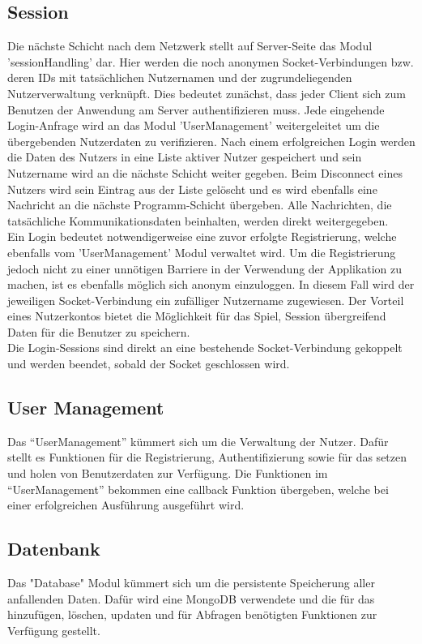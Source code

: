 \documentclass[a4paper]{spie}  %
\begin{document}
\subsection{Session}
Die nächste Schicht nach dem Netzwerk stellt auf Server-Seite das Modul 'sessionHandling' dar. Hier werden die noch anonymen Socket-Verbindungen bzw. deren IDs mit tatsächlichen Nutzernamen und der zugrundeliegenden Nutzerverwaltung verknüpft. Dies bedeutet zunächst, dass jeder Client sich zum Benutzen der Anwendung am Server authentifizieren muss. Jede eingehende Login-Anfrage wird an das Modul 'UserManagement' weitergeleitet um die übergebenden Nutzerdaten zu verifizieren. Nach einem erfolgreichen Login werden die Daten des Nutzers in eine Liste aktiver Nutzer gespeichert und sein Nutzername wird an die nächste Schicht weiter gegeben. Beim Disconnect eines Nutzers wird sein Eintrag aus der Liste gelöscht und es wird ebenfalls eine Nachricht an die nächste Programm-Schicht übergeben. Alle Nachrichten, die tatsächliche Kommunikationsdaten beinhalten, werden direkt weitergegeben.\\
Ein Login bedeutet notwendigerweise eine zuvor erfolgte Registrierung, welche ebenfalls vom 'UserManagement' Modul verwaltet wird. Um die Registrierung jedoch nicht zu einer unnötigen Barriere in der Verwendung der Applikation zu machen, ist es ebenfalls möglich sich anonym einzuloggen. In diesem Fall wird der jeweiligen Socket-Verbindung ein zufälliger Nutzername zugewiesen. Der Vorteil eines Nutzerkontos bietet die Möglichkeit für das Spiel, Session übergreifend Daten für die Benutzer zu speichern.\\
Die Login-Sessions sind direkt an eine bestehende Socket-Verbindung gekoppelt und werden beendet, sobald der Socket geschlossen wird.
\subsection{User Management}
Das \enquote{UserManagement} kümmert sich um die Verwaltung der Nutzer. Dafür stellt es Funktionen für die Registrierung, Authentifizierung sowie für das setzen und holen von Benutzerdaten zur Verfügung. Die Funktionen im \enquote{UserManagement} bekommen eine callback Funktion übergeben, welche bei einer erfolgreichen Ausführung ausgeführt wird.

\subsection{Datenbank}
Das "Database" Modul kümmert sich um die persistente Speicherung aller anfallenden Daten. Dafür wird eine MongoDB verwendete und die für das hinzufügen, löschen, updaten und für Abfragen benötigten Funktionen zur Verfügung gestellt.
\end{document}
